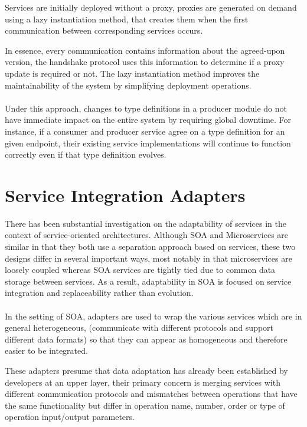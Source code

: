 Services are initially deployed without a proxy, proxies are generated on demand using a lazy instantiation method, that creates them when the first communication between corresponding services occurs.

In essence, every communication contains information about the agreed-upon version, the handshake protocol uses this information to determine if a proxy update is required or not.
The lazy instantiation method improves the maintainability of the system by
simplifying deployment operations.

\paragraph{}

Under this approach, changes to type definitions in a producer module do not have immediate impact on the entire system by requiring global downtime.
For instance, if a consumer and producer service agree on a type definition for an given endpoint,
their existing service implementations will continue to function correctly even if that type definition evolves.

\section{Service Integration Adapters} %
\label{sec:service_integration_adapters}

There has been substantial investigation on the adaptability of services in the context of service-oriented architectures.
Although SOA \cite{7} and Microservices \cite{microservices} are similar in that they both use a separation approach based on services,
these two designs differ in several important ways, most notably in that microservices are loosely coupled whereas SOA services are tightly tied due to common data storage between services.
As a result, adaptability in SOA is focused on service integration and replaceability rather than evolution.

\paragraph{}

In the setting of SOA, adapters are used to wrap the various services which are in general heterogeneous,
(communicate with different protocols and support different data formats) so that they can appear as homogeneous and therefore easier to be integrated.

These adapters presume that data adaptation has already been established by developers at an upper layer,
their primary concern is merging services with different communication protocols and mismatches between operations that have the
same functionality but differ in operation name, number, order or type of operation input/output parameters.

